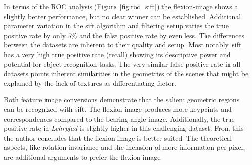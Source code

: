 In terms of the ROC analysis (Figure~\ref{fig:roc_sift}) the \gls{flexion-image} shows a slightly better performance, but no clear winner can be established.
Additional parameter variation in the \acrshort{sift} algorithm and filtering setup varies the true positive rate by only $5\%$ and the false positive rate by even less.
The differences between the datasets are inherent to their quality and setup.
Most notably, \acrshort{sift} has a very high true positive rate (recall) showing its descriptive power and potential for object recognition tasks.
The very similar false positive rate in all datasets points inherent similarities in the geometries of the scenes that might be explained by the lack of textures as differentiating factor.

Both feature image conversions demonstrate that the salient geometric regions can be recognized with \acrshort{sift}.
The \gls{flexion-image} produces more keypoints and correspondences compared to the \gls{bearing-angle-image}.
Additionally, the true positive rate in \emph{Lehrpfad} is slightly higher in this challenging dataset.
From this the author concludes that the \gls{flexion-image} is better suited.
The theoretical aspects, like rotation invariance and the inclusion of more information per pixel, are additional arguments to prefer the \gls{flexion-image}.
